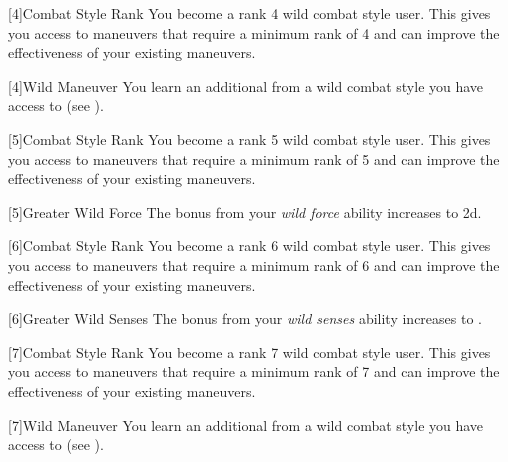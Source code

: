        {
            [4]{Combat Style Rank} You become a rank 4 wild combat style user.
            This gives you access to maneuvers that require a minimum rank of 4 and can improve the effectiveness of your existing maneuvers.

            [4]{Wild Maneuver}
            You learn an additional  from a wild combat style you have access to (see ).
        }

        {
            [5]{Combat Style Rank} You become a rank 5 wild combat style user.
            This gives you access to maneuvers that require a minimum rank of 5 and can improve the effectiveness of your existing maneuvers.

            [5]{Greater Wild Force} The bonus from your \textit{wild force} ability increases to \plus2d.
        }

        {
            [6]{Combat Style Rank} You become a rank 6 wild combat style user.
            This gives you access to maneuvers that require a minimum rank of 6 and can improve the effectiveness of your existing maneuvers.

            [6]{Greater Wild Senses} The bonus from your \textit{wild senses} ability increases to .
        }

        {
            [7]{Combat Style Rank} You become a rank 7 wild combat style user.
            This gives you access to maneuvers that require a minimum rank of 7 and can improve the effectiveness of your existing maneuvers.

            [7]{Wild Maneuver}
            You learn an additional  from a wild combat style you have access to (see ).
        }




